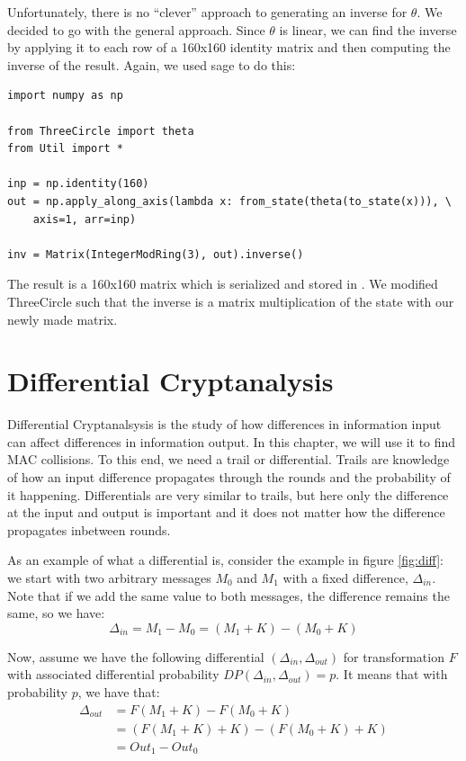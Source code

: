 \documentclass{report}
\newcommand{\ThreeCircle}{{\sc ThreeCircle} }
\begin{document}
\newpage
Unfortunately, there is no ``clever'' approach to generating an inverse for $\theta$. We decided to go with the general approach.
Since $\theta$ is linear, we can find the inverse by applying it to each row of a 160x160 identity matrix and then computing the inverse of the result.
Again, we used sage to do this:
\begin{verbatim}
import numpy as np

from ThreeCircle import theta
from Util import *

inp = np.identity(160)
out = np.apply_along_axis(lambda x: from_state(theta(to_state(x))), \
    axis=1, arr=inp)

inv = Matrix(IntegerModRing(3), out).inverse()
\end{verbatim}
The result is a 160x160 matrix which is serialized and stored in . We modified \ThreeCircle such that the inverse is a matrix multiplication of the state with our newly made matrix.

\section{Differential Cryptanalysis}
Differential Cryptanalsysis is the study of how differences in information input can affect differences in information output. In this chapter, we will use it to find MAC collisions. To this end, we need a trail or differential. Trails are knowledge of how an input difference propagates through the rounds and the probability of it happening. Differentials are very similar to trails, but here only the difference at the input and output is important and it does not matter how the difference propagates inbetween rounds.

As an example of what a differential is, consider the example in figure \ref{fig:diff}:
we start with two arbitrary messages $M_0$ and $M_1$ with a fixed difference, $\Delta_{in}$. Note that if we add the same value to both messages, the difference remains the same, so we have: 
\begin{equation*}
\Delta_{in} = M_1 - M_0 = (M_1 + K) - (M_0 + K)
\end{equation*}

Now, assume we have the following differential $(\Delta_{in}, \Delta_{out})$ for transformation $F$ with associated differential probability $DP(\Delta_{in}, \Delta_{out}) = p$. It means that with probability $p$, we have that:
\begin{equation*}
\begin{split}
\Delta_{out} &= F(M_1 + K) - F(M_0 + K) \\
&= (F(M_1 + K) + K) - (F(M_0 + K) + K) \\
&= Out_1 - Out_0
\end{split}
\end{equation*}
\end{document}
